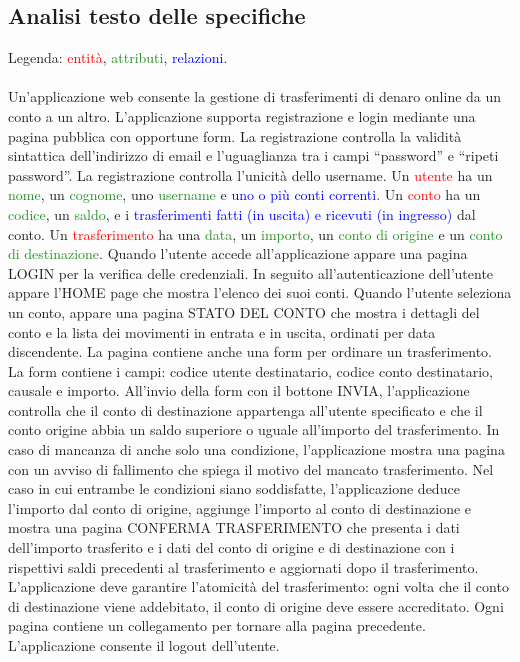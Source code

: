 \documentclass{article}
\begin{document}
	\subsection{Analisi testo delle specifiche}
	Legenda: \textcolor{red}{entità}, \textcolor{ForestGreen}{attributi}, \textcolor{blue}{relazioni}.
	\\
	\\
	Un’applicazione web consente la gestione di trasferimenti di denaro online da un conto a un
	altro. L’applicazione supporta registrazione e login mediante una pagina pubblica con
	opportune form. La registrazione controlla la validità sintattica dell’indirizzo di email e
	l’uguaglianza tra i campi “password” e “ripeti password”. La registrazione controlla l’unicità
	dello username. Un \textcolor{red}{utente} ha un \textcolor{ForestGreen}{nome}, un \textcolor{ForestGreen}{cognome}, uno \textcolor{ForestGreen}{username} e \textcolor{blue}{uno o più conti correnti}.
	Un \textcolor{red}{conto}  ha un \textcolor{ForestGreen}{codice}, un \textcolor{ForestGreen}{saldo}, e i \textcolor{blue}{trasferimenti fatti (in uscita) e ricevuti (in ingresso)} dal
	conto. Un  \textcolor{red}{trasferimento} ha una \textcolor{ForestGreen}{data}, un \textcolor{ForestGreen}{importo}, un \textcolor{ForestGreen}{conto di origine} e un \textcolor{ForestGreen}{conto di destinazione}.
	Quando l’utente accede all’applicazione appare una pagina LOGIN per la verifica delle
	credenziali. In seguito all’autenticazione dell’utente appare l’HOME page che mostra l’elenco
	dei suoi conti. Quando l’utente seleziona un conto, appare una pagina STATO DEL CONTO
	che mostra i dettagli del conto e la lista dei movimenti in entrata e in uscita, ordinati per data
	discendente. La pagina contiene anche una form per ordinare un trasferimento. La form
	contiene i campi: codice utente destinatario, codice conto destinatario, causale e importo.
	All’invio della form con il bottone INVIA, l’applicazione controlla che il conto di destinazione
	appartenga all’utente specificato e che il conto origine abbia un saldo superiore o uguale
	all’importo del trasferimento. In caso di mancanza di anche solo una condizione, l’applicazione
	mostra una pagina con un avviso di fallimento che spiega il motivo del mancato trasferimento.
	Nel caso in cui entrambe le condizioni siano soddisfatte, l’applicazione deduce l’importo dal
	conto di origine, aggiunge l’importo al conto di destinazione e mostra una pagina CONFERMA
	TRASFERIMENTO che presenta i dati dell’importo trasferito e i dati del conto di origine e di
	destinazione con i rispettivi saldi precedenti al trasferimento e aggiornati dopo il trasferimento.
	L’applicazione deve garantire l’atomicità del trasferimento: ogni volta che il conto di
	destinazione viene addebitato, il conto di origine deve essere accreditato. Ogni pagina
	contiene un collegamento per tornare alla pagina precedente. L’applicazione consente il
	logout dell’utente.
	
\end{document}
